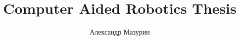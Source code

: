 \documentclass[rusmathsym, eqnumwithinsec, amspack, hyperref]{bomgost}
\title{Computer Aided Robotics Thesis}
\author{Александр Мазурин}
\date{}
\begin{document}
\label{start-doc}


\newpage
~


\mainpart






\renewcommand\refname{СПИСОК ИСПОЛЬЗОВАННЫХ ИСТОЧНИКОВ}
\printbibliography

\label{end-doc}




\end{document}
